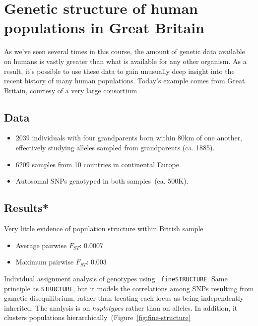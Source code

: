 \chapter{Genetic structure of human populations in Great Britain}

As we've seen several times in this course, the amount of genetic data
available on humans is vastly greater than what is available for any
other organism. As a result, it's possible to use these data to gain
unusually deep insight into the recent history of many human
populations. Today's example comes from Great Britain, courtesy of a
very large consortium~\cite{Leslie-etal-2015}

\section*{Data}

\begin{itemize}

\item 2039 individuals with four grandparents born within 80km of one
  another, effectively studying alleles sampled from grandparents
  (ca. 1885). 

\item 6209 samples from 10 countries in continental Europe.

\item Autosomal SNPs genotyped in both samples~(ca. 500K). 

\end{itemize}

\section*{Results*}

Very little evidence of population structure within British sample

\begin{itemize}

\item Average pairwise $F_{ST}$: 0.0007

\item Maximum pairwise $F_{ST}$: 0.003

\end{itemize}

Individual assignment analysis of genotypes using {\tt
  fineSTRUCTURE}. Same principle as {\tt STRUCTURE}, but it models the
correlations among SNPs resulting from gametic disequilibrium, rather
than treating each locus as being independently inherited. The
analysis is on {\it haplotypes\/} rather than on alleles. In addition,
it clusters populations
hierarchically~(Figure~\ref{fig:fine-structure}

